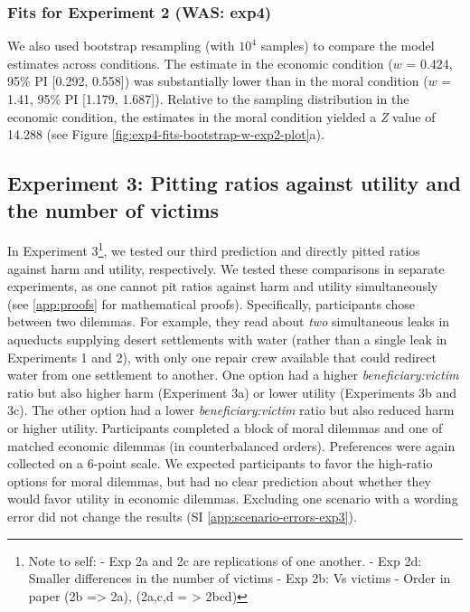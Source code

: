 \documentclass[
]{article}
\begin{document}
\subsubsection{Fits for Experiment 2 (WAS: exp4)}\label{fits-for-experiment-2-was-exp4}

We also used bootstrap resampling (with \ensuremath{10^{4}} samples) to compare the model estimates across conditions. The estimate in the economic condition (\(w\) = 0.424, 95\% PI {[}0.292, 0.558{]}) was substantially lower than in the moral condition (\(w\) = 1.41, 95\% PI {[}1.179, 1.687{]}). Relative to the sampling distribution in the economic condition, the estimates in the moral condition yielded a \emph{Z} value of 14.288 (see Figure \ref{fig:exp4-fits-bootstrap-w-exp2-plot}a).

\clearpage

\subsection{Experiment 3: Pitting ratios against utility and the number of victims}\label{experiment-3-pitting-ratios-against-utility-and-the-number-of-victims}

In Experiment 3\footnote{Note to self:
  - Exp 2a and 2c are replications of one another.
  - Exp 2d: Smaller differences in the number of victims
  - Exp 2b: Vs victims
  - Order in paper (2b =\textgreater{} 2a), (2a,c,d = \textgreater{} 2bcd)}, we tested our third prediction and directly pitted ratios against harm and utility, respectively. We tested these comparisons in separate experiments, as one cannot pit ratios against harm and utility simultaneously (see \ref{app:proofs} for mathematical proofs). Specifically, participants chose between two dilemmas. For example, they read about \emph{two} simultaneous leaks in aqueducts supplying desert settlements with water (rather than a single leak in Experiments 1 and 2), with only one repair crew available that could redirect water from one settlement to another. One option had a higher \emph{beneficiary:victim} ratio but also higher harm (Experiment 3a) or lower utility (Experiments 3b and 3c). The other option had a lower \emph{beneficiary:victim} ratio but also reduced harm or higher utility. Participants completed a block of moral dilemmas and one of matched economic dilemmas (in counterbalanced orders). Preferences were again collected on a 6-point scale. We expected participants to favor the high-ratio options for moral dilemmas, but had no clear prediction about whether they would favor utility in economic dilemmas. Excluding one scenario with a wording error did not change the results (SI \ref{app:scenario-errors-exp3}).
\end{document}
